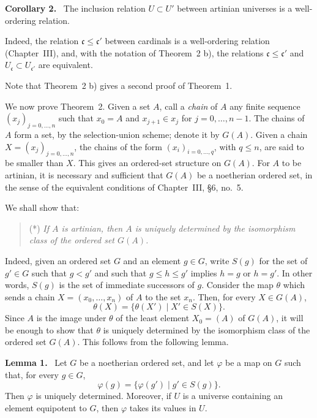 \documentclass[11pt]{article}
\newenvironment{statement}[1]{\par\medskip\noindent\textbf{#1.}\ }{\par\medskip}
\begin{document}
\begin{statement}{Corollary 2}
The inclusion relation \(U\subset U'\) between artinian universes is a well-ordering relation.
\end{statement}
Indeed, the relation \(\mathfrak c\leq\mathfrak c'\) between cardinals is a well-ordering relation (Chapter~III), and, with the notation of Theorem~2 b), the relations \(\mathfrak c\leq\mathfrak c'\) and \(U_{\mathfrak c}\subset U_{\mathfrak c'}\) are equivalent.

Note that Theorem~2 b) gives a second proof of Theorem~1.

We now prove Theorem~2. Given a set \(A\), call a \emph{chain} of \(A\) any finite sequence \((x_j)_{j=0,\ldots,n}\) such that \(x_0=A\) and \(x_{j+1}\in x_j\) for \(j=0,\ldots,n-1\). The chains of \(A\) form a set, by the selection-union scheme; denote it by \(G(A)\). Given a chain \(X=(x_j)_{j=0,\ldots,n}\), the chains of the form \((x_i)_{i=0,\ldots,q}\), with \(q\leq n\), are said to be smaller than \(X\). This gives an ordered-set structure on \(G(A)\). For \(A\) to be artinian, it is necessary and sufficient that \(G(A)\) be a noetherian ordered set, in the sense of the equivalent conditions of Chapter~III, \S{}6, no.~5.

We shall show that:
\begin{quote}
(*) \emph{If \(A\) is artinian, then \(A\) is uniquely determined by the isomorphism class of the ordered set \(G(A)\).}
\end{quote}
Indeed, given an ordered set \(G\) and an element \(g\in G\), write \(S(g)\) for the set of \(g'\in G\) such that \(g<g'\) and such that \(g\leq h\leq g'\) implies \(h=g\) or \(h=g'\). In other words, \(S(g)\) is the set of immediate successors of \(g\). Consider the map \(\theta\) which sends a chain \(X=(x_0,\ldots,x_n)\) of \(A\) to the set \(x_n\). Then, for every \(X\in G(A)\),
\[
 \theta(X)=\{\theta(X')\mid X'\in S(X)\}.
\]
Since \(A\) is the image under \(\theta\) of the least element \(X_0=(A)\) of \(G(A)\), it will be enough to show that \(\theta\) is uniquely determined by the isomorphism class of the ordered set \(G(A)\). This follows from the following lemma.

\begin{statement}{Lemma 1}
Let \(G\) be a noetherian ordered set, and let \(\varphi\) be a map on \(G\) such that, for every \(g\in G\),
\begin{equation}
 \varphi(g)=\{\varphi(g')\mid g'\in S(g)\}.
 \tag{1}
\end{equation}
Then \(\varphi\) is uniquely determined. Moreover, if \(U\) is a universe containing an element equipotent to \(G\), then \(\varphi\) takes its values in \(U\).
\end{statement}
\end{document}
